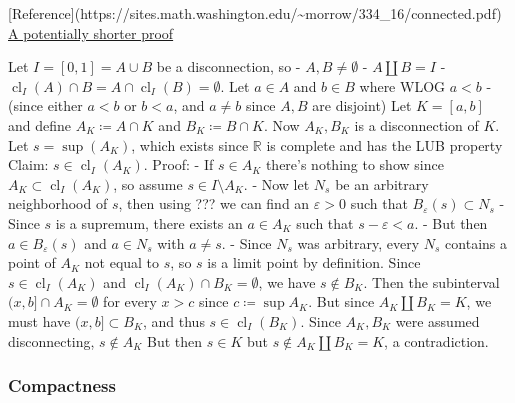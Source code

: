 \begin{solution}

\hfill

\begin{concept}

\hfill [Reference](https://sites.math.washington.edu/\textasciitilde morrow/334\_16/connected.pdf)
\href{https://math.stackexchange.com/questions/934421/proof-of-that-every-interval-is-connected}{A
potentially shorter proof}

\end{concept}

Let \(I = [0, 1] = A\cup B\) be a disconnection, so -
\(A, B \neq \emptyset\) - \(A {\textstyle\coprod}B = I\) -
\({ \operatorname{cl}} _I(A) \cap B = A \cap{ \operatorname{cl}} _I(B) = \emptyset\).
Let \(a\in A\) and \(b\in B\) where WLOG \(a<b\) - (since either \(a<b\)
or \(b<a\), and \(a\neq b\) since \(A, B\) are disjoint) Let
\(K = [a, b]\) and define \(A_K \coloneqq A\cap K\) and
\(B_K \coloneqq B\cap K\). Now \(A_K, B_K\) is a disconnection of \(K\).
Let \(s = \sup(A_K)\), which exists since \({\mathbb{R}}\) is complete
and has the LUB property Claim: \(s \in { \operatorname{cl}} _I(A_K)\).
Proof: - If \(s\in A_K\) there's nothing to show since
\(A_K \subset { \operatorname{cl}} _I(A_K)\), so assume
\(s\in I\setminus A_K\). - Now let \(N_s\) be an arbitrary neighborhood
of \(s\), then using ??? we can find an \(\varepsilon>0\) such that
\(B_\varepsilon(s) \subset N_s\) - Since \(s\) is a supremum, there
exists an \(a\in A_K\) such that \(s-\varepsilon< a\). - But then
\(a \in B_\varepsilon(s)\) and \(a\in N_s\) with \(a\neq s\). - Since
\(N_s\) was arbitrary, every \(N_s\) contains a point of \(A_K\) not
equal to \(s\), so \(s\) is a limit point by definition. Since
\(s\in { \operatorname{cl}} _I(A_K)\) and
\({ \operatorname{cl}} _I(A_K)\cap B_K = \emptyset\), we have
\(s\not \in B_K\). Then the subinterval \((x, b] \cap A_K = \emptyset\)
for every \(x>c\) since \(c \coloneqq\sup A_K\). But since
\(A_K {\textstyle\coprod}B_K = K\), we must have \((x, b] \subset B_K\),
and thus \(s\in { \operatorname{cl}} _I(B_K)\). Since \(A_K, B_K\) were
assumed disconnecting, \(s\not \in A_K\) But then \(s\in K\) but
\(s\not\in A_K {\textstyle\coprod}B_K = K\), a contradiction.

\end{solution}

\hypertarget{compactness}{%
\subsubsection{Compactness}\label{compactness}}

